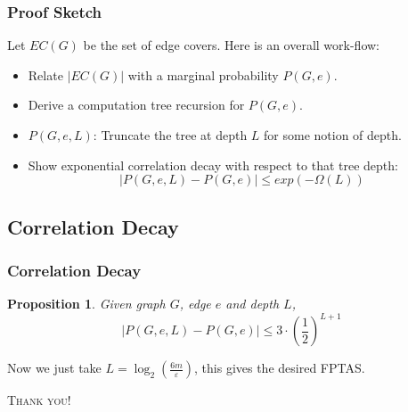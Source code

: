 \documentclass[mathserif]{beamer}
\newtheorem{proposition}[theorem]{Proposition}
\newcommand{\abs}[1]{\left\vert#1\right\vert}
\newcommand{\eps}{\varepsilon}
\begin{document}
\begin{frame}
	\frametitle{Proof Sketch}
Let $EC(G)$ be the set of edge covers.
Here is an overall work-flow:
\begin{itemize}
  \item{Relate $\abs{EC(G)}$ with a marginal probability $P(G,e)$.}
  \item{Derive a computation tree recursion for $P(G,e)$.}
  \item{$P(G,e,L)$: Truncate the tree at depth $L$ for some notion of depth.}
  \item\alert{ Show exponential correlation decay with respect to that tree depth:
  \[
    \abs{ P(G,e,L) - P(G,e) } \leq exp(-\Omega(L))
  \]}
\end{itemize}
\end{frame}

\subsection{Correlation Decay}
\begin{frame}
	\frametitle{Correlation Decay}

\begin{proposition}
	Given graph $G$, edge $e$ and depth $L$,
	\[\abs{P(G,e,L) - P(G,e)} \leq 3\cdot(\frac{1}{2})^{L+1}\]
\end{proposition}
    Now we just take $L = \log_2 \left(\frac{6m}{\eps} \right)$, this gives the desired FPTAS.
\end{frame}

\begin{frame}
	\begin{center}
		\Huge \scshape Thank you!
	\end{center}
\end{frame}
\end{document}
